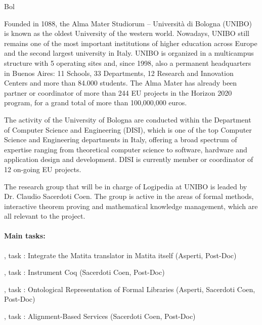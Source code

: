 \begin{sitedescription}{Bol}


Founded in 1088, the Alma Mater Studiorum – Università di Bologna (UNIBO) is known as the oldest University of the western world. Nowadays, UNIBO still remains one of the most important institutions of higher education across Europe and the second largest university in Italy. UNIBO is organized in a multicampus structure with 5 operating sites and, since 1998, also a permanent headquarters in Buenos Aires: 11 Schools, 33 Departments, 12 Research and Innovation Centers and more than 84.000 students. The Alma Mater has already been partner or coordinator of more than 244 EU projects in the Horizon 2020 program, for a grand total of more than 100,000,000 euros.

The activity of the University of Bologna are conducted within the Department of Computer Science and Engineering (DISI), which is one of the top Computer Science and Engineering departments in Italy, offering a broad spectrum of expertise ranging from theoretical computer science to software, hardware and application design and development. DISI is currently member or coordinator of 12 on-going EU projects.

The research group that will be in charge of Logipedia at UNIBO is leaded by Dr. Claudio Sacerdoti Coen. The group is active in the areas of formal methods, interactive theorem proving and mathematical knowledge management, which are all relevant to the project.

\paragraph{Main tasks:}

\begin{compactitem}
\item {}, task : Integrate the Matita translator in Matita itself (Asperti, Post-Doc)
\item {}, task : Instrument Coq (Sacerdoti Coen, Post-Doc)
\item {}, task : Ontological Representation of Formal Libraries (Asperti, Sacerdoti Coen, Post-Doc)
\item {}, task : Alignment-Based Services (Sacerdoti Coen, Post-Doc)
\end{compactitem}


\end{sitedescription}
